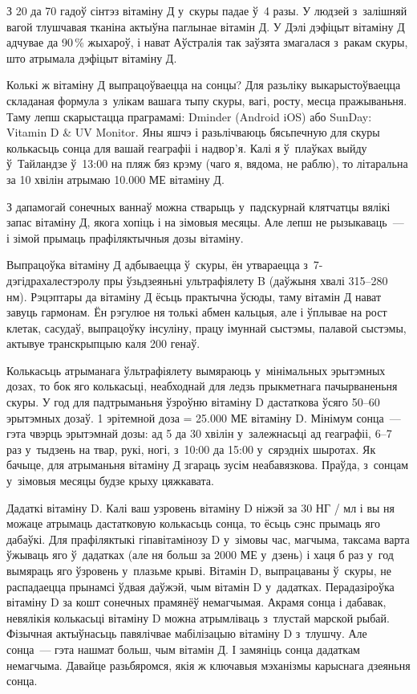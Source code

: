 З 20 да 70 гадоў сінтэз вітаміну Д у~скуры падае ў~4 разы. У людзей з~залішняй вагой тлушчавая тканіна актыўна паглынае вітамін Д. У Дэлі дэфіцыт вітаміну Д адчувае да 90\,\% жыхароў, і нават Аўстралія так заўзята змагалася з~ракам скуры, што атрымала дэфіцыт вітаміну Д. 

Колькі ж вітаміну Д выпрацоўваецца на сонцы? Для разьліку выкарыстоўваецца складаная формула з~улікам вашага тыпу скуры, вагі, росту, месца пражываньня. Таму лепш скарыстацца праграмамі: Dminder (Android iOS) або SunDay: Vitamin D \& UV Monitor. Яны яшчэ і разьлічваюць бясьпечную для скуры колькасьць сонца для вашай геаграфіі і надвор'я. Калі я ў~плаўках выйду ў~Тайландзе ў~13:00 на пляж бяз крэму (чаго я, вядома, не раблю), то літаральна за 10 хвілін атрымаю 10.000 МЕ вітаміну Д. 

З дапамогай сонечных ваннаў можна стварыць у~падскурнай клятчатцы вялікі запас вітаміну Д, якога хопіць і на зімовыя месяцы. Але лепш не рызыкаваць~--- і зімой прымаць прафіляктычныя дозы вітаміну. 

Выпрацоўка вітаміну Д адбываецца ў~скуры, ён утвараецца з~7-дэгідрахалестэролу пры ўзьдзеяньні ультрафіялету B (даўжыня хвалі 315--280 нм). Рэцэптары да вітаміну Д ёсьць практычна ўсюды, таму вітамін Д нават завуць гармонам. Ён рэгулюе ня толькі абмен кальцыя, але і ўплывае на рост клетак, сасудаў, выпрацоўку інсуліну, працу імуннай сыстэмы, палавой сыстэмы, актывуе транскрыпцыю каля 200 генаў.

Колькасьць атрыманага ўльтрафіялету вымяраюць у~мінімальных эрытэмных дозах, то бок яго колькасьці, неабходнай для ледзь прыкметнага пачырваненьня скуры. У год для падтрыманьня ўзроўню вітаміну D дастаткова ўсяго 50--60 эрытэмных дозаў. 1 эрітемной доза = 25.000 МЕ вітаміну D. Мінімум сонца~--- гэта чвэрць эрытэмнай дозы: ад 5 да 30 хвілін у~залежнасьці ад геаграфіі, 6--7 раз у~тыдзень на твар, рукі, ногі, з~10:00 да 15:00 у~сярэдніх шыротах. Як бачыце, для атрыманьня вітаміну Д згараць зусім неабавязкова. Праўда, з~сонцам у~зімовыя месяцы будзе крыху цяжкавата.

Дадаткі вітаміну D. Калі ваш узровень вітаміну D ніжэй за 30 НГ / мл і вы ня можаце атрымаць дастатковую колькасьць сонца, то ёсьць сэнс прымаць яго дабаўкі. Для прафіляктыкі гіпавітамінозу D у~зімовы час, магчыма, таксама варта ўжываць яго ў~дадатках (але ня больш за 2000 МЕ у~дзень) і хаця б раз у~год вымяраць яго ўзровень у~плазьме крыві. Вітамін D, выпрацаваны ў~скуры, не распадаецца прынамсі ўдвая даўжэй, чым вітамін D у~дадатках. Перадазіроўка вітаміну D за кошт сонечных прамянёў немагчымая. Акрамя сонца і дабавак, невялікія колькасьці вітаміну D можна атрымліваць з~тлустай марской рыбай. Фізычная актыўнасьць павялічвае мабілізацыю вітаміну D з~тлушчу. Але сонца~--- гэта нашмат больш, чым вітамін Д. І замяніць сонца дадаткам немагчыма. Давайце разьбяромся, якія ж ключавыя мэханізмы карыснага дзеяньня сонца.

